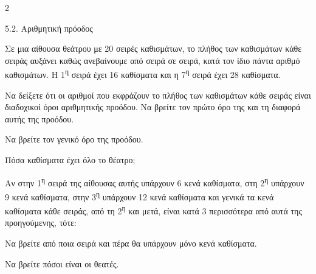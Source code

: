 \begin{ylh}{2}
    \item 5.2. Αριθμητική πρόοδος
\end{ylh}
Σε μια αίθουσα θεάτρου με 20 σειρές καθισμάτων, το πλήθος των καθισμάτων κάθε σειράς αυξάνει καθώς ανεβαίνουμε από σειρά σε σειρά, κατά τον ίδιο πάντα αριθμό καθισμάτων. Η 1\textsuperscript{η} σειρά έχει 16 καθίσματα και η 7\textsuperscript{η} σειρά έχει 28 καθίσματα.

\begin{alist}
\item Να δείξετε ότι οι αριθμοί που εκφράζουν το πλήθος των καθισμάτων κάθε σειράς είναι διαδοχικοί όροι αριθμητικής προόδου. Να βρείτε τον πρώτο όρο της και τη διαφορά αυτής της προόδου.
\item Να βρείτε τον γενικό όρο της προόδου.
\item Πόσα καθίσματα έχει όλο το θέατρο;
\item Αν στην 1\textsuperscript{η} σειρά της αίθουσας αυτής υπάρχουν 6 κενά καθίσματα, στη 2\textsuperscript{η} υπάρχουν 9 κενά καθίσματα, στην 3\textsuperscript{η} υπάρχουν 12 κενά καθίσματα και γενικά τα κενά καθίσματα κάθε σειράς, από τη 2\textsuperscript{η} και μετά, είναι κατά 3 περισσότερα από αυτά της προηγούμενης, τότε:
\begin{rlist}
\item
  Να βρείτε από ποια σειρά και πέρα θα υπάρχουν μόνο κενά καθίσματα.
\item
  Να βρείτε πόσοι είναι οι θεατές.
\end{rlist}
\end{alist}

